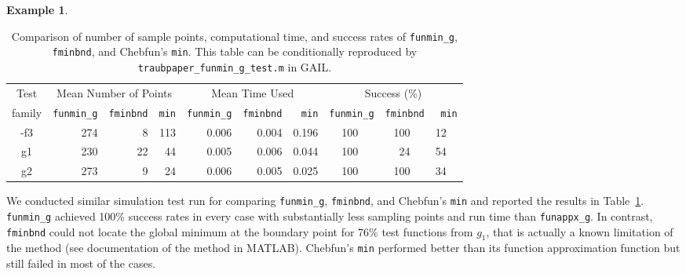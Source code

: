 \documentclass[review]{elsarticle}
\theoremstyle{definition}
\newtheorem{exmp}{Example}
\newcommand{\funappxg}{\texttt{funappx\_g}\xspace}
\newcommand{\funming}{\texttt{funmin\_g\xspace}}
\newcommand{\fminbnd}{\texttt{fminbnd\xspace}}
\begin{document}
\begin{exmp}
%
\begin{table}[tbh]
	\centering
	\caption{Comparison of number of sample points, computational time,  and success
		rates of \funming, \fminbnd, and
		Chebfun's \texttt{min}.
		This table can be conditionally reproduced by
		\texttt{traubpaper\_funmin\_g\_test.m} in GAIL.}
	\label{tab:funmingVsfminbndVsChebfun}
	{\footnotesize
		\setlength{\tabcolsep}{.48em} %
		\begin{tabular}{|c|rrr|rrr|rrrrrr|}
			\hline
			Test      &     \multicolumn{3}{c|}{Mean Number of Points} & \multicolumn{3}{c|}{Mean Time Used}  & \multicolumn{6}{|c|}{Success (\%)}
			\\  family &  \funming  &  \fminbnd    &  \texttt{min}    & \funming     &  \fminbnd  & \texttt{min}   & \multicolumn{2}{r}{\funming} & \multicolumn{2}{r}{\fminbnd} & \multicolumn{2}{r|}{\texttt{min}}
			\\ \hline
			-f3   &  274   &   8   &   113    &   0.006   &    0.004    &  0.196  &    100   &  &  100   &   &  12 &
			\\ \phantom{-}g1   &  230   &  22   &    44    &   0.005   &    0.006    &  0.044  &    100   &  &   24   &   &  54 &
			\\ \phantom{-}g2   &  273   &   9   &    24    &   0.006   &    0.005    &  0.025  &    100   &  &  100   &   &  34 &
			\\ \hline
		\end{tabular}
	}
\end{table}
%

We conducted similar simulation test run for comparing \funming, \fminbnd, and
Chebfun's \texttt{min} and reported the results in
Table~\ref{tab:funmingVsfminbndVsChebfun}. \funming{} achieved 100\%
success rates in every case with substantially less sampling points and run time than \funappxg.
In contrast, \fminbnd{} could not locate the global
minimum at the boundary point for 76\% test functions from $g_1$, that is actually a known
limitation of the method (see documentation of the method in MATLAB). Chebfun's
{\tt min} performed better than its function approximation function but still failed in most of the cases.

\end{exmp}
\end{document}
